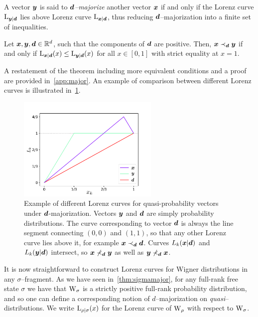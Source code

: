 \documentclass[pra,
aps,
twocolumn,
superscriptaddress,
groupedaddress,
nofootinbib,
reprint
]{revtex4-1}
\begin{document}
A vector $\bm{y}$ is said to \emph{$\bm{d}$--majorize} another vector $\bm{x}$ if and only if the Lorenz curve ${{\rm{L}}_{\bm{y}|\bm{d}}}$ lies above Lorenz curve ${{\rm{L}}_{\bm{x}|\bm{d}}}$, thus reducing $\bm{d}$--majorization into a finite set of inequalities.
\begin{theorem}\label{thm:dmajor}
    Let $\bm{x}, \bm{y}, \bm{d} \in \mathbb{R}^d$, such that the components of $\bm{d}$ are positive. 
    Then, $\bm{x} \prec_{\bm{d}} \bm{y}$ if and only if ${{\rm{L}}_{\bm{x}|\bm{d}}}(x) \leq {{\rm{L}}_{\bm{y}|\bm{d}}}(x)$ for all $x \in [0,1]$ with strict equality at $x=1$.
\end{theorem}
A restatement of the theorem including more equivalent conditions and a proof are provided in~\cref{app:major}.
An example of comparison between different Lorenz curves is illustrated in~\cref{fig:lctoy}.
\begin{figure}
    \centering
    \includegraphics[height=5cm]{figs/lctoy.pdf}
    \caption{Example of different Lorenz curves for quasi-probability vectors under $\bm{d}$-majorization.
    Vectors $\bm{y}$ and $\bm{d}$ are simply probability distributions.
    The curve corresponding to vector $\bm{d}$ is always the line segment connecting $(0,0)$ and $(1,1)$, so that any other Lorenz curve lies above it, for example $\bm{x} \prec_{\bm{d}} \bm{d}$.
    Curves $L_k(\bm{x}|\bm{d})$ and $L_k(\bm{y}|\bm{d})$ intersect, so $\bm{x} \nprec_{\bm{d}} \bm{y}$ as well as $\bm{y} \nprec_{\bm{d}} \bm{x}$.
    }
    \label{fig:lctoy}
\end{figure}

It is now straightforward to construct Lorenz curves for Wigner distributions in any $\sigma$--fragment.
As we have seen in~\cref{thm:sigmamajor}, for any full-rank free state $\sigma$ we have that $\W{\sigma}$ is a strictly positive full-rank probability distribution, and so one can define a corresponding notion of $d$--majorization on \emph{quasi}--distributions.
We write ${{\rm{L}}_{\rho|\sigma}}(x)$ for the Lorenz curve of $\W{\rho}$ with respect to $\W{\sigma}$.
\end{document}

